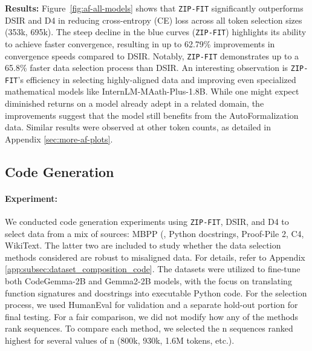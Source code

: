 \textbf{Results:} 
Figure~\ref{fig:af-all-models} shows that \texttt{ZIP-FIT} significantly outperforms DSIR and D4 in reducing cross-entropy (CE) loss across all token selection sizes (353k, 695k).
The steep decline in the blue curves (\texttt{ZIP-FIT}) highlights its ability to achieve faster convergence, resulting in up to 62.79\% improvements in convergence speeds compared to DSIR. 
Notably, \texttt{ZIP-FIT} demonstrates up to a 65.8\% faster data selection process than DSIR. 
An interesting observation is \texttt{ZIP-FIT}'s efficiency in selecting highly-aligned data and improving even specialized mathematical models like InternLM-MAath-Plus-1.8B. 
While one might expect diminished returns on a model already adept in a related domain, the improvements suggest that the model still benefits from the AutoFormalization data. 
Similar results were observed at other token counts, as detailed in Appendix \ref{sec:more-af-plots}. 

\subsection{Code Generation}

\paragraph{Experiment:} 
We conducted code generation experiments using \texttt{ZIP-FIT}, DSIR, and D4 to select data from a mix of sources:
MBPP (\cite{austin2021programsynthesislargelanguage}, Python docstrings, Proof-Pile 2, C4, WikiText. 
The latter two are included to study whether the data selection methods considered are robust to misaligned data. 
For details, refer to Appendix \ref{app:subsec:dataset_composition_code}.
The datasets were utilized to fine-tune both CodeGemma-2B and Gemma2-2B models, with the focus on translating function signatures and docstrings into executable Python code. 
For the selection process, we used HumanEval for validation and a separate hold-out portion for final testing. 
For a fair comparison, we did not modify how any of the methods rank sequences. 
To compare each method, we selected the n sequences ranked highest for several values of n (800k, 930k, 1.6M tokens, etc.). 

